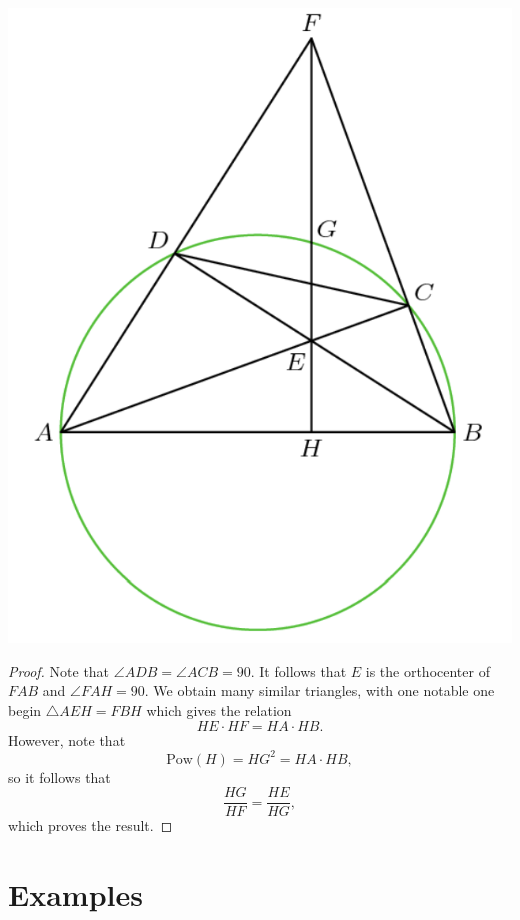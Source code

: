 \documentclass[12pt]{scrartcl}
\newcommand{\<}{\langle}
\renewcommand{\>}{\rangle}
\begin{document}
\begin{center}
\includegraphics[scale=0.6]{graphics/p1-2.png}
\end{center}
\begin{proof}
Note that $\angle ADB = \angle ACB = 90$.  It follows that $E$ is the orthocenter of $FAB$ and $\angle FAH = 90$. We obtain many similar triangles, with one notable one begin $\triangle AEH = FBH$ which gives the relation 
$$HE \cdot HF = HA \cdot HB.$$
However, note that 
$$\text{Pow}(H) = HG^2 = HA \cdot HB,$$
so it follows that 
$$\frac{HG}{HF} = \frac{HE}{HG},$$
which proves the result.
\end{proof}
\pagebreak
\section{Examples}
\end{document}
